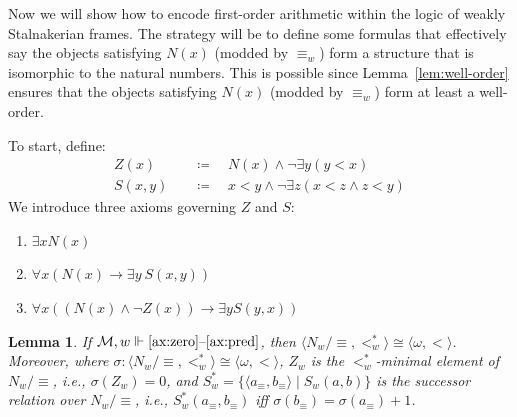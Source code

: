 \documentclass[12pt]{article}
\newtheorem{lemma}{Lemma}
\newcommand{\tup}[1]{\langle #1 \rangle}
\newcommand{\then}{\mathbin{\rightarrow}}
\begin{document}
Now we will show how to encode first-order arithmetic within the logic of weakly Stalnakerian frames. 
The strategy will be to define some formulas that effectively say the objects satisfying $N(x)$ (modded by $\equiv_w$) form a structure that is isomorphic to the natural numbers. 
This is possible since Lemma~\ref{lem:well-order} ensures that the objects satisfying $N(x)$ (modded by $\equiv_w$) form at least a well-order.  

To start, define:
\begin{align*}
    Z(x) & \quad\coloneqq\quad N(x) \wedge \neg\exists y (y < x) \\
    S(x,y) & \quad\coloneqq\quad x < y \wedge \neg\exists z (x < z \wedge z < y)
\end{align*}
We introduce three axioms governing $Z$ and $S$:
\begin{enumerate}[label=(Ax\arabic*),itemsep=1ex]
    \item $\exists x N(x)$\label{ax:zero}
    \item $\forall x (N(x) \then \exists y\ S(x,y))$\label{ax:succ}
    \item $\forall x((N(x) \wedge \neg Z(x)) \then \exists y S(y,x))$\label{ax:pred}
\end{enumerate}

\begin{lemma}\label{lem:nat}
    If $\mathcal{M},w \Vdash \text{\ref{ax:zero}--\ref{ax:pred}}$, then $\tup{N_w/\equiv,<_w^*} \cong \tup{\omega,<}$. 
    Moreover, where $\sigma\colon \tup{N_w/\equiv,<_w^*} \cong \tup{\omega,<}$, $Z_w$ is the $<_w^*$-minimal element of $N_w/\equiv$, i.e., $\sigma(Z_w) = 0$, and $S_w^* = \{\tup{a_\equiv,b_\equiv} \mid S_w(a,b)\}$ is the successor relation over $N_w/\equiv$, i.e., $S_w^*(a_\equiv,b_\equiv)$ iff $\sigma(b_\equiv) = \sigma(a_\equiv)+1$. 
\end{lemma}
\end{document}
